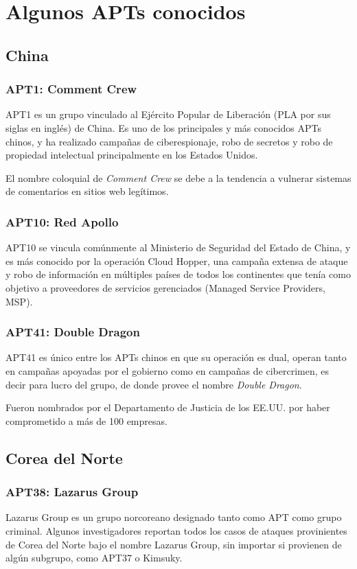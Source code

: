 \documentclass{article}
\begin{document}
\section{Algunos APTs conocidos}
\subsection{China}
\subsubsection{APT1: Comment Crew}
APT1 es un grupo vinculado al Ejército Popular de Liberación (PLA por sus siglas en inglés) de China. Es uno de los principales y más conocidos APTs chinos, y ha realizado campañas de ciberespionaje, robo de secretos y robo de propiedad intelectual principalmente en los Estados Unidos.

El nombre coloquial de {\it Comment Crew} se debe a la tendencia a vulnerar sistemas de comentarios en sitios web legítimos. \autocite{bbc-comment-crew}

\subsubsection{APT10: Red Apollo}
APT10 se vincula comúnmente al Ministerio de Seguridad del Estado de China, y es más conocido por la operación Cloud Hopper, una campaña extensa de ataque y robo de información en múltiples países de todos los continentes que tenía como objetivo a proveedores de servicios gerenciados (Managed Service Providers, MSP). \autocite{trendmicro-cloud-hopper}

\subsubsection{APT41: Double Dragon}
APT41 es único entre los APTs chinos en que su operación es dual, operan tanto en campañas apoyadas por el gobierno como en campañas de cibercrimen, es decir para lucro del grupo, de donde provee el nombre {\it Double Dragon}.

Fueron nombrados por el Departamento de Justicia de los EE.UU. por haber comprometido a más de 100 empresas. \autocite{zdnet-apt41}

\subsection{Corea del Norte}
\subsubsection{APT38: Lazarus Group}
Lazarus Group es un grupo norcoreano designado tanto como APT como grupo criminal. Algunos investigadores reportan todos los casos de ataques provinientes de Corea del Norte bajo el nombre Lazarus Group, sin importar si provienen de algún subgrupo, como APT37 o Kimsuky. \autocite{mitre-lazarus}
\end{document}
